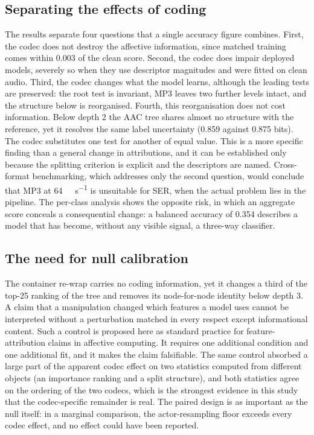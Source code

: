 \documentclass[lettersize,journal]{IEEEtran}
\begin{document}
\subsection{Separating the effects of coding}
The results separate four questions that a single accuracy figure combines.
First, the codec does not destroy the affective information, since matched
training comes within 0.003 of the clean score. Second, the codec does impair
deployed models, severely so when they use descriptor magnitudes and were
fitted on clean audio. Third, the codec changes what the model learns, although
the leading tests are preserved: the root test is invariant, MP3 leaves two
further levels intact, and the structure below is reorganised. Fourth, this
reorganisation does not cost information. Below depth 2 the AAC tree shares
almost no structure with the reference, yet it resolves the same label
uncertainty (0.859 against 0.875 bits). The codec substitutes one test for
another of equal value. This is a more specific finding than a general change
in attributions, and it can be established only because the splitting
criterion is explicit and the descriptors are named. Cross-format benchmarking,
which addresses only the second question, would conclude that MP3 at
\SI{64}{\kilo\bit\per\second} is unsuitable for SER, when the actual problem
lies in the pipeline. The per-class analysis shows the opposite risk, in which
an aggregate score conceals a consequential change: a balanced accuracy of 0.354
describes a model that has become, without any visible signal, a three-way
classifier.

\subsection{The need for null calibration}
The container re-wrap carries no coding information, yet it changes a third of
the top-25 ranking of the tree and removes its node-for-node identity below
depth 3. A claim that a manipulation changed which features a model uses cannot
be interpreted without a perturbation matched in every respect except
informational content. Such a control is proposed here as standard practice
for feature-attribution claims in affective computing. It requires one
additional condition and one additional fit, and it makes the claim
falsifiable. The same control absorbed a large part of the apparent codec
effect on two statistics computed from different objects (an importance ranking
and a split structure), and both statistics agree on the ordering of the two
codecs, which is the strongest evidence in this study that the codec-specific
remainder is real. The paired design is as important as the null itself: in a
marginal comparison, the actor-resampling floor exceeds every codec effect, and
no effect could have been reported.
\end{document}
